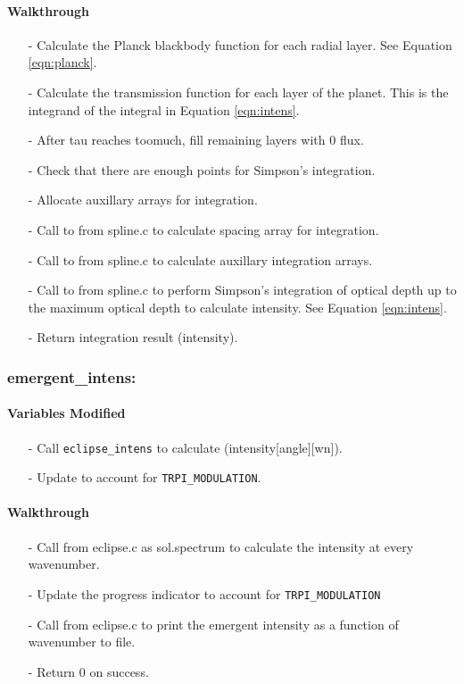 \documentclass[letterpaper,12pt]{article}
\begin{document}
\paragraph{Walkthrough}
\begin{enumerate}[leftmargin=10pt, noitemsep, parsep=0pt, topsep=0ex]
\item[-] Calculate the Planck blackbody function for each radial layer. See Equation \ref{eqn:planck}.
\item[-] Calculate the transmission function for each layer of the planet. This is the integrand of the integral in Equation \ref{eqn:intens}.
\item[-] After tau reaches toomuch, fill remaining layers with 0 flux.
\item[-] Check that there are enough points for Simpson's integration.
\item[-] Allocate auxillary arrays for integration.
\item[-] Call to  from spline.c to calculate spacing array for integration.
\item[-] Call to  from spline.c to calculate auxillary integration arrays.
\item[-] Call to  from spline.c to perform Simpson's integration of optical depth up to the maximum optical depth to calculate intensity. See Equation \ref{eqn:intens}.
\item[-] Return integration result (intensity).
\end{enumerate}

\subsubsection{emergent\_intens:}
\paragraph{Variables Modified}
\begin{enumerate}[leftmargin=10pt, noitemsep, parsep=0pt, topsep=0ex]
\item[-] Call {\tt eclipse\_intens} to calculate  (intensity[angle][wn]).
\item[-] Update  to account for {\tt TRPI\_MODULATION}.
\end{enumerate}

\noindent
\paragraph{Walkthrough}
\begin{enumerate}[leftmargin=10pt, noitemsep, parsep=0pt, topsep=0ex]
\item[-] Call  from eclipse.c as sol.spectrum to calculate the intensity at every wavenumber.
\item[-] Update the progress indicator to account for {\tt TRPI\_MODULATION}
\item[-] Call  from eclipse.c to print the emergent intensity as a function of wavenumber to file.
\item[-] Return 0 on success.
\end{enumerate}
\end{document}
